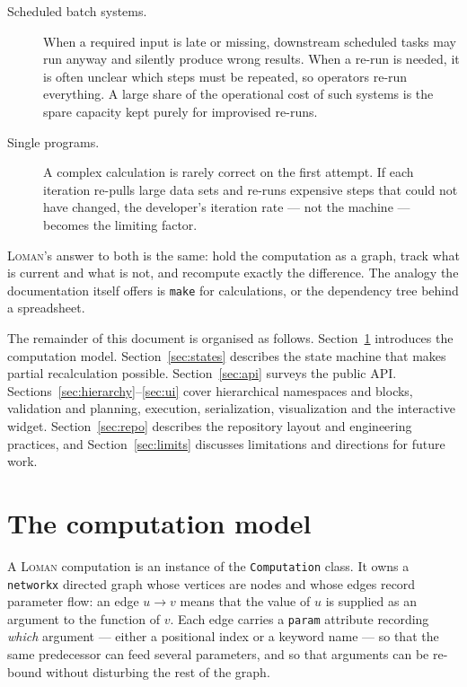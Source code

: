 \documentclass[11pt,a4paper]{article}
\newcommand{\loman}{\textsc{Loman}}
\newcommand{\code}[1]{\texttt{#1}}
\begin{document}
\begin{description}
  \item[Scheduled batch systems.] When a required input is late or missing,
  downstream scheduled tasks may run anyway and silently produce wrong
  results. When a re-run is needed, it is often unclear which steps must be
  repeated, so operators re-run everything. A large share of the operational
  cost of such systems is the spare capacity kept purely for improvised
  re-runs.
  \item[Single programs.] A complex calculation is rarely correct on the first
  attempt. If each iteration re-pulls large data sets and re-runs expensive
  steps that could not have changed, the developer's iteration rate --- not
  the machine --- becomes the limiting factor.
\end{description}

\loman{}'s answer to both is the same: hold the computation as a graph, track
what is current and what is not, and recompute exactly the difference. The
analogy the documentation itself offers is \code{make} for calculations, or the
dependency tree behind a spreadsheet.

The remainder of this document is organised as follows. Section~\ref{sec:model}
introduces the computation model. Section~\ref{sec:states} describes the state
machine that makes partial recalculation possible. Section~\ref{sec:api}
surveys the public API. Sections~\ref{sec:hierarchy}--\ref{sec:ui} cover
hierarchical namespaces and blocks, validation and planning, execution,
serialization, visualization and the interactive widget.
Section~\ref{sec:repo} describes the repository layout and engineering
practices, and Section~\ref{sec:limits} discusses limitations and directions
for future work.

\section{The computation model}\label{sec:model}

A \loman{} computation is an instance of the \code{Computation} class. It owns
a \code{networkx} directed graph \cite{networkx} whose vertices are nodes and
whose edges record parameter flow: an edge $u \to v$ means that the value of
$u$ is supplied as an argument to the function of $v$. Each edge carries a
\code{param} attribute recording \emph{which} argument --- either a positional
index or a keyword name --- so that the same predecessor can feed several
parameters, and so that arguments can be re-bound without disturbing the rest
of the graph.
\end{document}
